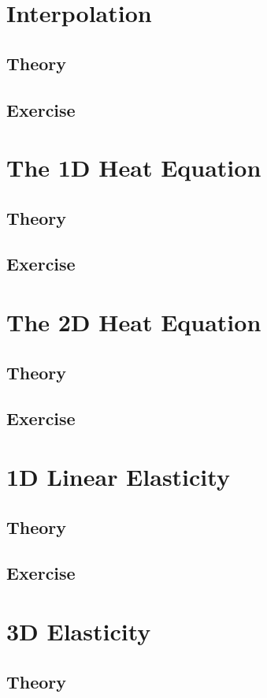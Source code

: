 \documentclass[a4paper, 11pt, oneside]{bookest}
\theoremstyle{definition}
\begin{document}
\chapter{Interpolation}
\section{Theory}
\section{Exercise}

\chapter{The 1D Heat Equation}
\section{Theory}
\section{Exercise}

\chapter{The 2D Heat Equation}
\section{Theory}
\section{Exercise}

\chapter{1D Linear Elasticity}
\section{Theory}
\section{Exercise}

\chapter{3D Elasticity}
\section{Theory}
\end{document}
